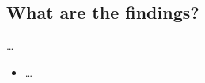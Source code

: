 \subsection{What are the findings?}

\dots

\begin{frame}
  \begin{itemize}
    \item \dots
  \end{itemize}
\end{frame}



\begin{frame}[allowframebreaks]
  \printbibliography{}
\end{frame}
